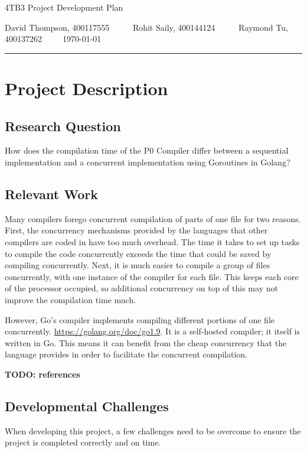 \documentclass{article}
\author{Rohit Saily, David Thompson, Raymond Tu}
\date{\today}
\title{\mytitle}
\newcommand{\mytitle}{4TB3 Project Development Plan}
\begin{document}
{\sffamily
{\huge \mytitle}

\medskip

David Thompson, 400117555~~~~~
Rohit Saily, 400144124~~~~~
Raymond Tu, 400137262~~~~~\today
}

\par\noindent\rule{\textwidth}{0.4pt}
\bigskip

\section{Project Description}

\subsection{Research Question}

How does the compilation time of the P0 Compiler differ between a sequential implementation and a concurrent implementation using Goroutines in Golang?  

\subsection{Relevant Work}

Many compilers forego concurrent compilation of parts of one file for two
reasons.
First, the concurrency mechanisms provided by the languages that other compilers
are coded in have too much overhead.
The time it takes to set up tasks to compile the code concurrently exceeds the
time that could be saved by compiling concurrently.
Next, it is much easier to compile a group of files concurrently, with one
instance of the compiler for each file.
This keeps each core of the processor occupied, so additional concurrency on top
of this may not improve the compilation time much.

However, Go's compiler implements compiling different portions of one file
concurrently.
\url{https://golang.org/doc/go1.9}.
It is a self-hosted compiler; it itself is written in Go.
This means it can benefit from the cheap concurrency that the language provides
in order to facilitate the concurrent compilation.

\textbf{TODO: references}

\subsection{Developmental Challenges} %
When developing this project, a few challenges need to be overcome to ensure the 
project is completed correctly and on time.
\end{document}
